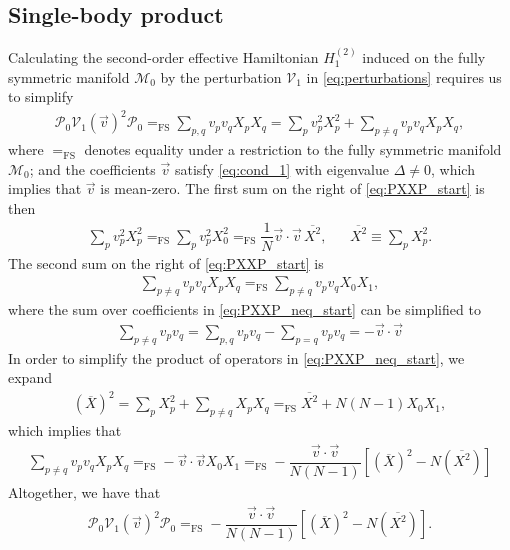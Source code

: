 \documentclass[nofootinbib,notitlepage,11pt]{revtex4-2}
\newcommand{\f}[2]{\dfrac{#1}{#2}} %
\newcommand{\p}[1]{\left(#1\right)} %
\renewcommand{\sp}[1]{\left[#1\right]} %
\renewcommand{\c}{\cdot} %
\renewcommand{\v}{\vec} %
\newcommand{\1}{\mathds{1}}
\newcommand{\M}{\mathcal{M}}
\renewcommand{\P}{\mathcal{P}}
\newcommand{\V}{\mathcal{V}}
\newcommand{\EQFS}{=_{\text{FS}}}
\newcommand{\col}{\overline}
\begin{document}
\subsection{Single-body product}
\label{sec:PXXP}

Calculating the second-order effective Hamiltonian $H_1^{(2)}$ induced
on the fully symmetric manifold $\M_0$ by the perturbation $\V_1$ in
\eqref{eq:perturbations} requires us to simplify
\begin{align}
  \P_0 \V_1\p{\v v}^2 \P_0
  \EQFS \sum_{p,q} v_p v_q X_p X_q
  = \sum_p v_p^2 X_p^2
  + \sum_{p\ne q} v_p v_q X_p X_q,
  \label{eq:PXXP_start}
\end{align}
where $\EQFS$ denotes equality under a restriction to the fully
symmetric manifold $\M_0$; and the coefficients $\v v$ satisfy
\eqref{eq:cond_1} with eigenvalue $\Delta\ne0$, which implies that
$\v v$ is mean-zero.  The first sum on the right of
\eqref{eq:PXXP_start} is then
\begin{align}
  \sum_p v_p^2 X_p^2
  \EQFS \sum_p v_p^2 X_0^2
  \EQFS \f1N \v v\c\v v\, \col{X^2},
  &&
  \col{X^2} \equiv \sum_p X_p^2.
  \label{eq:PXXP_eq}
\end{align}
The second sum on the right of \eqref{eq:PXXP_start} is
\begin{align}
  \sum_{p\ne q} v_p v_q X_p X_q
  \EQFS \sum_{p\ne q} v_p v_q X_0 X_1,
  \label{eq:PXXP_neq_start}
\end{align}
where the sum over coefficients in \eqref{eq:PXXP_neq_start} can be
simplified to
\begin{align}
  \sum_{p\ne q} v_p v_q
  = \sum_{p,q} v_p v_q - \sum_{p=q} v_p v_q
  = - \v v\c\v v
\end{align}
In order to simplify the product of operators in
\eqref{eq:PXXP_neq_start}, we expand
\begin{align}
  \p{\col{X}}^2
  = \sum_p X_p^2 + \sum_{p\ne q} X_p X_q
  \EQFS \col{X^2} + N \p{N-1} X_0 X_1,
  \label{eq:PXXP_neq_ops}
\end{align}
which implies that
\begin{align}
  \sum_{p\ne q} v_p v_q X_p X_q
  \EQFS - \v v\c\v v X_0 X_1
  \EQFS -\f{\v v\c\v v}{N\p{N-1}}
  \sp{\p{\col{X}}^2 - N \p{\col{X^2}}}
  \label{eq:PXXP_neq}
\end{align}
Altogether, we have that
\begin{align}
  \P_0 \V_1\p{\v v}^2 \P_0
  \EQFS -\f{\v v\c\v v}{N\p{N-1}}
  \sp{\p{\col{X}}^2 - N \p{\col{X^2}}}.
\end{align}
\end{document}
